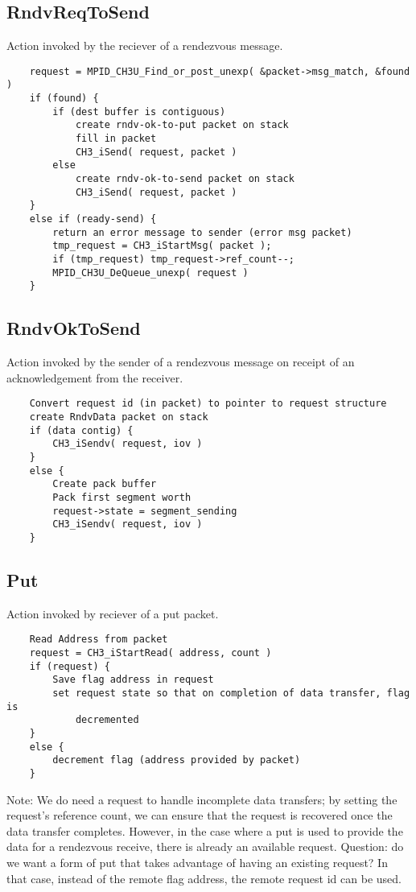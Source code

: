 \documentclass{article}
\begin{document}
\subsection{RndvReqToSend}
Action invoked by the reciever of a rendezvous message.
\begin{verbatim}
    request = MPID_CH3U_Find_or_post_unexp( &packet->msg_match, &found )
    if (found) {
        if (dest buffer is contiguous)
            create rndv-ok-to-put packet on stack
            fill in packet
            CH3_iSend( request, packet )
        else
            create rndv-ok-to-send packet on stack
            CH3_iSend( request, packet )
    }
    else if (ready-send) {
        return an error message to sender (error msg packet)
        tmp_request = CH3_iStartMsg( packet );
        if (tmp_request) tmp_request->ref_count--;
        MPID_CH3U_DeQueue_unexp( request )
    }
\end{verbatim}

\subsection{RndvOkToSend}
Action invoked by the sender of a rendezvous message on receipt of an
acknowledgement from the receiver.
\begin{verbatim}
    Convert request id (in packet) to pointer to request structure
    create RndvData packet on stack
    if (data contig) {
        CH3_iSendv( request, iov )
    }
    else {
        Create pack buffer
        Pack first segment worth
        request->state = segment_sending
        CH3_iSendv( request, iov )
    }
\end{verbatim}

\subsection{Put}
Action invoked by reciever of a put packet.  
\begin{verbatim}
    Read Address from packet
    request = CH3_iStartRead( address, count )
    if (request) {
        Save flag address in request
        set request state so that on completion of data transfer, flag is
            decremented
    }
    else {
        decrement flag (address provided by packet)
    }
\end{verbatim}
Note: We do need a request to handle incomplete data transfers; by setting the
request's reference count, we can ensure that the request is recovered once
the data transfer completes.  However, in the case where a put is used to
provide the data for a rendezvous receive, there is already an available
request.  Question: do we want a form of put that takes advantage of having an
existing request?  In that case, instead of the remote flag address, the
remote request id can be used.
\end{document}
